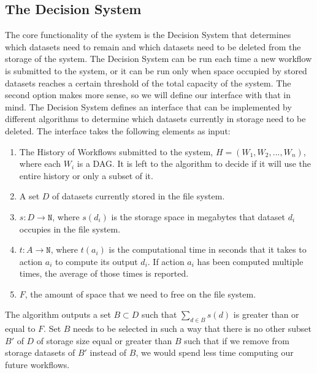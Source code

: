 \subsection{The Decision System}
\label{sec:decision_system}
The core functionality of the system is the Decision System that determines which datasets need to remain and which datasets need to be deleted from the storage of the system.  The Decision System can be run each time a new workflow is submitted to the system, or it can be run only when space occupied by stored datasets reaches a certain threshold of the total capacity of the system. The second option makes more sense, so we will define our interface with that in mind. The Decision System defines an interface that can be implemented by different algorithms to determine which datasets currently in storage need to be deleted. The interface takes the following elements as input:

\begin{enumerate}
\item The History of Workflows submitted to the system, $H = (W_1, W_2, ..., W_n)$, where each $W_i$ is a DAG. It is left to the algorithm to decide if it will use the entire history or only a subset of it.

\item A set $D$ of datasets currently stored in the file system. 

\item $s: D \to \mathtt{N} $, where $s(d_i)$ is the storage space in megabytes that dataset $d_i$ occupies in the file system.

\item $t: A \to \mathtt{N}$, where $t(a_i)$ is the computational time in seconds that it takes to action $a_i$ to compute its output $d_i$.  If action $a_i$ has been computed multiple times, the average of those times is reported.

\item $F$, the amount of space that we need to free on the file system.

\end{enumerate}

The algorithm outputs a set $B \subset D$ such that $\sum_{d \in B}{s(d)}$ is greater than or equal to $F$.  Set $B$ needs to be selected in such a way that there is no other subset $B'$ of $D$ of storage size equal or greater than $B$ such that if we remove from storage datasets of $B'$ instead of $B$, we would spend less time computing our future workflows. 

